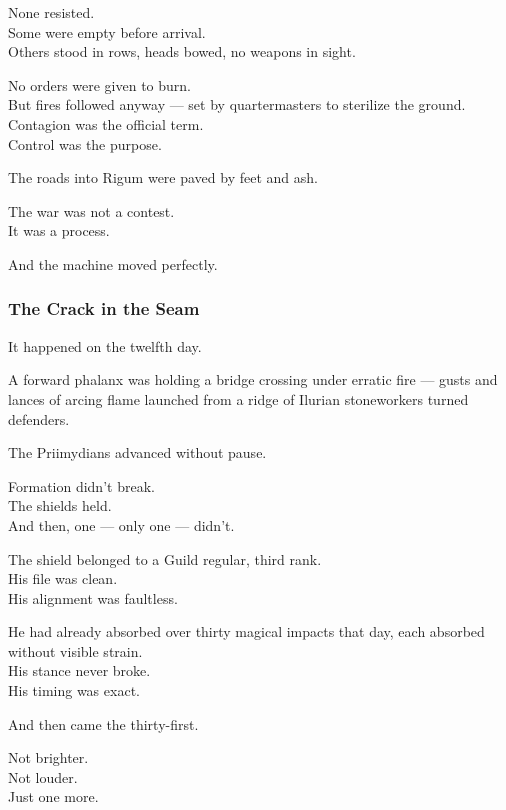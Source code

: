 \documentclass[12pt]{article}
\begin{document}
None resisted.\\
Some were empty before arrival.\\
Others stood in rows, heads bowed, no weapons in sight.

No orders were given to burn.\\
But fires followed anyway — set by quartermasters to sterilize the ground.\\
Contagion was the official term.\\
Control was the purpose.

\vspace{1em}

The roads into Rigum were paved by feet and ash.

The war was not a contest.\\
It was a process.

And the machine moved perfectly.

\dotfill

\subsubsection*{The Crack in the Seam}

It happened on the twelfth day.

A forward phalanx was holding a bridge crossing under erratic fire — gusts and lances of arcing flame launched from a ridge of Ilurian stoneworkers turned defenders.

The Priimydians advanced without pause.

Formation didn’t break.\\
The shields held.\\
And then, one — only one — didn’t.

\vspace{1em}

The shield belonged to a Guild regular, third rank.\\
His file was clean.\\
His alignment was faultless.

He had already absorbed over thirty magical impacts that day, each absorbed without visible strain.\\
His stance never broke.\\
His timing was exact.

And then came the thirty-first.

Not brighter.\\
Not louder.\\
Just one more.
\end{document}
